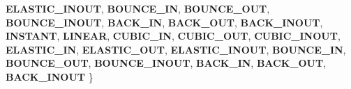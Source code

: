\begin{DoxyCompactItemize}
{\bfseries E\+L\+A\+S\+T\+I\+C\+\_\+\+I\+N\+O\+UT}, 
\newline
{\bfseries B\+O\+U\+N\+C\+E\+\_\+\+IN}, 
{\bfseries B\+O\+U\+N\+C\+E\+\_\+\+O\+UT}, 
{\bfseries B\+O\+U\+N\+C\+E\+\_\+\+I\+N\+O\+UT}, 
{\bfseries B\+A\+C\+K\+\_\+\+IN}, 
\newline
{\bfseries B\+A\+C\+K\+\_\+\+O\+UT}, 
{\bfseries B\+A\+C\+K\+\_\+\+I\+N\+O\+UT}, 
{\bfseries I\+N\+S\+T\+A\+NT}, 
{\bfseries L\+I\+N\+E\+AR}, 
\newline
{\bfseries C\+U\+B\+I\+C\+\_\+\+IN}, 
{\bfseries C\+U\+B\+I\+C\+\_\+\+O\+UT}, 
{\bfseries C\+U\+B\+I\+C\+\_\+\+I\+N\+O\+UT}, 
{\bfseries E\+L\+A\+S\+T\+I\+C\+\_\+\+IN}, 
\newline
{\bfseries E\+L\+A\+S\+T\+I\+C\+\_\+\+O\+UT}, 
{\bfseries E\+L\+A\+S\+T\+I\+C\+\_\+\+I\+N\+O\+UT}, 
{\bfseries B\+O\+U\+N\+C\+E\+\_\+\+IN}, 
{\bfseries B\+O\+U\+N\+C\+E\+\_\+\+O\+UT}, 
\newline
{\bfseries B\+O\+U\+N\+C\+E\+\_\+\+I\+N\+O\+UT}, 
{\bfseries B\+A\+C\+K\+\_\+\+IN}, 
{\bfseries B\+A\+C\+K\+\_\+\+O\+UT}, 
{\bfseries B\+A\+C\+K\+\_\+\+I\+N\+O\+UT}
 \}
\end{DoxyCompactItemize}
